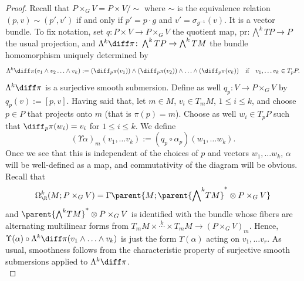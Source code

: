 \begin{proof}
    Recall that \(P\times_G V=P \times V/\sim\) where \(\sim\) is the equivalence relation \((p, v) \sim (p', v')\) if and only if \(p'=p\cdot g\) and \(v'=\sigma_{g^{-1}}(v)\). It is a vector bundle. To fix notation, set \(q\colon P \times V \to P \times_G V\) the quotient map, \(\mathrm{pr}\colon \bigwedge^k TP \to P\) the usual projection, and \(\Lambda^k\diff\pi \colon \bigwedge^k TP \to \bigwedge^k TM\) the bundle homomorphism uniquely determined by 
    \[
    \Lambda^k \diff \pi (v_1 \wedge v_2 \ldots \wedge v_k):=(\diff_p\pi(v_1))\wedge (\diff_p \pi(v_2))\wedge \ldots \wedge (\diff_p\pi(v_k)) \ \ \ \text{if} \ \ \ v_1, \ldots v_k \in T_pP.
    \]
    \(\Lambda^k \diff \pi\) is a surjective smooth submersion. Define as well \(q_p\colon V \to P\times_G V\) by \(q_p(v):=[p,v]\). Having said that, let \(m \in M\), \(v_i \in T_mM\), \(1 \leq i \leq k\), and choose \(p \in P\) that projects onto \(m\) (that is \(\pi(p)=m\)). Choose as well \(w_i \in T_pP\) such that \(\diff_p\pi(w_i)=v_i\) for \(1 \leq i \leq k\). We define
    \begin{equation} \label{eq_def_alpha}
    (\Upsilon\alpha)_m(v_1, \ldots v_k):=(q_p \circ \alpha_p)(w_1, \ldots w_k).
    \end{equation}
    Once we see that this is independent of the choices of \(p\) and vectors \(w_1, \ldots w_k\), \(\alpha\) will be well-defined as a map, and commutativity of the diagram will be obvious. Recall that
    \[
    \Omega^k_\R(M;P \times_G V)=\Gamma \parent{M; \parent{{\bigwedge}^kTM}^* \otimes P \times_G V}
    \]
    and \(\parent{{\bigwedge}^kTM}^* \otimes P \times_G V\) is identified with the bundle whose fibers are alternating multilinear forms from \(T_mM\times \overset{k}{\cdots} \times T_mM \to (P \times_G V)_m\). Hence, \(\Upsilon(\alpha) \circ \Lambda^k \diff \pi(v_1 \wedge \ldots \wedge v_k)\) is just the form \(\Upsilon(\alpha)\) acting on \(v_1, \ldots v_r\). As usual, smoothness follows from the characteristic property of surjective smooth submersions \parencite[Th. 4.29]{lee_introSM} applied to \(\Lambda^k \diff\pi\).  \\


\end{proof}
